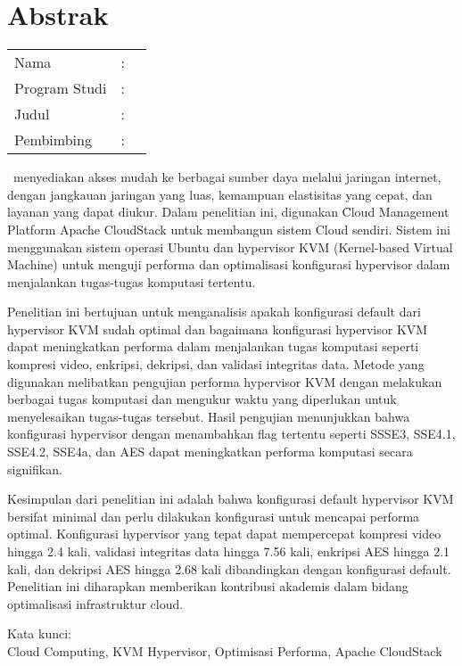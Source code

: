 %
%
%

\chapter*{Abstrak}

\vspace*{0.2cm}
{
	\setlength{\parindent}{0pt}

	\begin{tabular}{@{}l l p{10cm}}
		Nama          & : & \penulis    \\
		Program Studi & : & \program    \\
		Judul         & : & \judul      \\
		Pembimbing    & : & \pembimbing \\
	\end{tabular}

	\bigskip
	\bigskip

	\cc\ menyediakan akses mudah ke berbagai sumber daya melalui jaringan internet, dengan jangkauan jaringan yang luas, kemampuan elastisitas yang cepat, dan layanan yang dapat diukur. Dalam penelitian ini, digunakan \f{Cloud Management Platform} Apache CloudStack untuk membangun sistem Cloud sendiri. Sistem ini menggunakan sistem operasi Ubuntu dan hypervisor KVM (Kernel-based Virtual Machine) untuk menguji performa dan optimalisasi konfigurasi hypervisor dalam menjalankan tugas-tugas komputasi tertentu.

	Penelitian ini bertujuan untuk menganalisis apakah konfigurasi default dari hypervisor KVM sudah optimal dan bagaimana konfigurasi hypervisor KVM dapat meningkatkan performa dalam menjalankan tugas komputasi seperti kompresi video, enkripsi, dekripsi, dan validasi integritas data. Metode yang digunakan melibatkan pengujian performa hypervisor KVM dengan melakukan berbagai tugas komputasi dan mengukur waktu yang diperlukan untuk menyelesaikan tugas-tugas tersebut. Hasil pengujian menunjukkan bahwa konfigurasi hypervisor dengan menambahkan flag tertentu seperti SSSE3, SSE4.1, SSE4.2, SSE4a, dan AES dapat meningkatkan performa komputasi secara signifikan.

	Kesimpulan dari penelitian ini adalah bahwa konfigurasi default hypervisor KVM bersifat minimal dan perlu dilakukan konfigurasi untuk mencapai performa optimal. Konfigurasi hypervisor yang tepat dapat mempercepat kompresi video hingga 2.4 kali, validasi integritas data hingga 7.56 kali, enkripsi AES hingga 2.1 kali, dan dekripsi AES hingga 2.68 kali dibandingkan dengan konfigurasi default. Penelitian ini diharapkan memberikan kontribusi akademis dalam bidang optimalisasi infrastruktur cloud.

	\bigskip

	Kata kunci:\\
	Cloud Computing, KVM Hypervisor, Optimisasi Performa, Apache CloudStack
}

\newpage